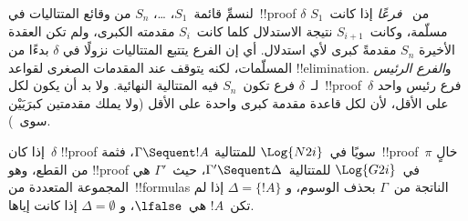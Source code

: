 \documentclass[../../../include/open-logic-section]{subfiles}
\begin{document}
لنسمِّ قائمة~$S_1$، \dots، $S_n$ من وقائع المتتاليات في~!!{proof}
$\delta$ من~ \emph{فرعًا} إذا كانت~$S_1$ مسلّمة، وكانت~$S_{i+1}$
نتيجة الاستدلال كلما كانت~$S_i$ مقدمته الكبرى، ولم تكن العقدة الأخيرة
$S_n$ مقدمةً كبرى لأي استدلال. أي إن الفرع يتتبع المتتاليات نزولًا في
$\delta$ بدءًا من المسلّمات، لكنه يتوقف عند المقدمات الصغرى لقواعد
!!{elimination}. و\emph{الفرع الرئيس} لـ~$\delta$ فرع تكون~$S_n$ فيه
المتتالية النهائية. ولا بد أن يكون لكل~!!{proof}~$\delta$ فرع رئيس واحد
على الأقل، لأن لكل قاعدة مقدمة كبرى واحدة على الأقل (ولا يملك مقدمتين
كبرَيَيْن سوى~\Intro{\land}).

\begin{prop}
إذا كان~$\delta$ !!{proof} سويًا في~$\Log{N2i}$ للمتتالية
$\Gamma \Sequent !A$، فثمة~!!{proof}~$\pi$ خالٍ من القطع، وهو
!!{proof} في~$\Log{G2i}$
للمتتالية~$\Gamma' \Sequent \Delta$، حيث~$\Gamma'$ هي المجموعة المتعددة
من~!!{formula}s الناتجة من~$\Gamma$ بحذف الوسوم، و
$\Delta=\{!A\}$ إذا لم تكن~$!A$ هي~$\lfalse$، و
$\Delta=\emptyset$ إذا كانت إياها.
\end{prop}
\end{document}
